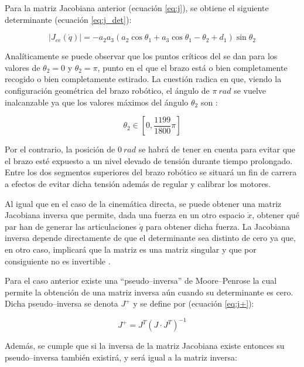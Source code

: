 Para la matriz Jacobiana anterior (ecuación \ref{eq:j}), se obtiene el siguiente
determinante (ecuación \ref{eq:j_det}):

\begin{equation}\label{eq:j_det}
    \left|J_{ee}\left(\dot{q}\right)\right| = - a_{2} a_{3} \left(a_{2} \cos{\theta_{1}} + a_{3} \cos{\theta_{1} - \theta_{2}} + d_{1}\right) \sin{\theta_{2}}
\end{equation}

Analíticamente se puede observar que los puntos críticos del \pArm{} se dan para
los valores de $\theta_2 = 0$ y $\theta_2 = \pi$, punto en el que el brazo está o bien
completamente recogido o bien completamente estirado. La cuestión radica en que, viendo
la configuración geométrica del brazo robótico, el ángulo de $\pi~rad$ se
vuelve inalcanzable ya que los valores máximos del ángulo $\theta_2$ son \cite{UArmDeveloperSwiftProForArduino}:

\begin{equation*}
    \theta_2 \in \left[0, \frac{1199}{1800}\pi\right]
\end{equation*}

Por el contrario, la posición de $0~rad$ se habrá de tener en cuenta para
evitar que el brazo esté expuesto a un nivel elevado de tensión durante tiempo prolongado.
Entre los dos segmentos superiores del brazo robótico se situará un fin de carrera a
efectos de evitar dicha tensión además de regular y calibrar los motores.

Al igual que en el caso de la cinemática directa, se puede obtener una matriz Jacobiana
inversa que permite, dada una fuerza en un otro espacio $\dot{x}$, obtener qué par han
de generar las articulaciones $\dot{q}$ para obtener dicha fuerza. La Jacobiana inversa
depende directamente de que el determinante sea distinto de cero ya que, en otro caso,
implicará que la matriz es una matriz singular y que por consiguiente no es invertible
\cite{InvertibleMatrix2020}.

Para el caso anterior existe una ``pseudo--inversa'' de Moore--Penrose \cite{PseudoinversaMoorePenrose2020}
la cual permite la obtención de una matriz inversa aún cuando su determinante es cero.
Dicha pseudo--inversa se denota $J^+$ y se define por (ecuación \ref{eq:j+}):

\begin{equation}\label{eq:j+}
    J^+ = J^T (J \cdot J^T)^{-1}
\end{equation}

Además, se cumple que si la inversa de la matriz Jacobiana existe entonces su pseudo--inversa
también existirá, y será igual a la matriz inversa:

